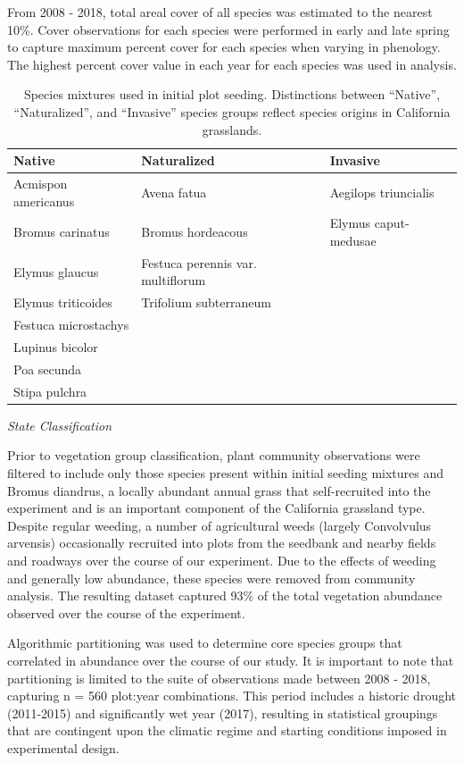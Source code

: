 \documentclass[twoside,12pt,final]{ucthesis-CA2012}
\begin{document}
\begin{ucmainmatter}
From 2008 - 2018, total areal cover of all species was estimated to the nearest 10\%. Cover observations for each species were performed in early and late spring to capture maximum percent cover for each species when varying in phenology. The highest percent cover value in each year for each species was used in analysis.
\begin{table}[ht]
\centering
\begin{tabular}{lll}
  \hline
Native & Naturalized & Invasive \\ 
  \hline
Acmispon americanus & Avena fatua & Aegilops triuncialis \\ 
  Bromus carinatus & Bromus hordeacous & Elymus caput-medusae \\ 
  Elymus glaucus & Festuca perennis var. multiflorum &  \\ 
  Elymus triticoides & Trifolium subterraneum &  \\ 
  Festuca microstachys &  &  \\ 
  Lupinus bicolor &  &  \\ 
  Poa secunda &  &  \\ 
  Stipa pulchra &  &  \\ 
   \hline
\end{tabular}
\caption{Species mixtures used in initial plot seeding. Distinctions between “Native”, “Naturalized”, and “Invasive” species groups reflect species origins in California grasslands.} 
\end{table}
\emph{State Classification}

Prior to vegetation group classification, plant community observations were filtered to include only those species present within initial seeding mixtures and Bromus diandrus, a locally abundant annual grass that self-recruited into the experiment and is an important component of the California grassland type.
Despite regular weeding, a number of agricultural weeds (largely Convolvulus arvensis) occasionally recruited into plots from the seedbank and nearby fields and roadways over the course of our experiment.
Due to the effects of weeding and generally low abundance, these species were removed from community analysis.
The resulting dataset captured 93\% of the total vegetation abundance observed over the course of the experiment.

Algorithmic partitioning was used to determine core species groups that correlated in abundance over the course of our study.
It is important to note that partitioning is limited to the suite of observations made between 2008 - 2018, capturing n = 560 plot:year combinations.
This period includes a historic drought (2011-2015) and significantly wet year (2017), resulting in statistical groupings that are contingent upon the climatic regime and starting conditions imposed in experimental design.


\end{ucmainmatter}
\end{document}
